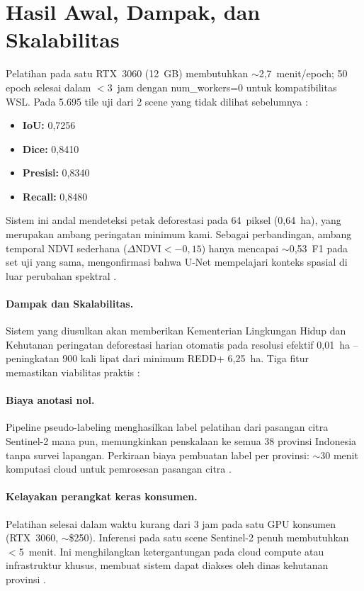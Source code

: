 \documentclass[10pt,a4paper,onecolumn]{article}
\begin{document}
\section{Hasil Awal, Dampak, dan Skalabilitas}
Pelatihan pada satu RTX~3060 (12~GB) membutuhkan $\sim$2,7~menit/epoch;
50 epoch selesai dalam ${<}$3~jam dengan num\_workers=0 untuk
kompatibilitas WSL. Pada 5.695 tile uji dari 2 scene yang tidak
dilihat sebelumnya \cite{powers2011evaluation}:
\begin{itemize}[nosep]
    \item \textbf{IoU:} 0,7256
    \item \textbf{Dice:} 0,8410
    \item \textbf{Presisi:} 0,8340
    \item \textbf{Recall:} 0,8480
\end{itemize}
Sistem ini andal mendeteksi petak deforestasi pada 64~piksel
(0,64~ha), yang merupakan ambang peringatan minimum kami. Sebagai
perbandingan, ambang temporal NDVI sederhana ($\Delta\text{NDVI}<-0,15$)
hanya mencapai $\sim$0,53~F1 pada set uji yang sama, mengonfirmasi
bahwa U-Net mempelajari konteks spasial di luar perubahan spektral \cite{goodfellow2016deep}.

\paragraph{Dampak dan Skalabilitas.}
Sistem yang diusulkan akan memberikan Kementerian Lingkungan Hidup
dan Kehutanan peringatan deforestasi harian otomatis pada resolusi
efektif 0,01~ha -- peningkatan 900 kali lipat dari minimum REDD+
6,25~ha. Tiga fitur memastikan viabilitas praktis \cite{moef2022folu}:

\paragraph{Biaya anotasi nol.}
Pipeline pseudo-labeling menghasilkan label pelatihan dari pasangan
citra Sentinel-2 mana pun, memungkinkan penskalaan ke semua 38
provinsi Indonesia tanpa survei lapangan. Perkiraan biaya pembuatan
label per provinsi: $\sim$30 menit komputasi cloud untuk pemrosesan
pasangan citra \cite{gorelick2017gee}.

\paragraph{Kelayakan perangkat keras konsumen.}
Pelatihan selesai dalam waktu kurang dari 3 jam pada satu GPU konsumen
(RTX~3060, $\sim$\$250). Inferensi pada satu scene Sentinel-2 penuh
membutuhkan ${<}$5~menit. Ini menghilangkan ketergantungan pada cloud
compute atau infrastruktur khusus, membuat sistem dapat diakses oleh
dinas kehutanan provinsi \cite{abadi2016tensorflow}.
\end{document}
